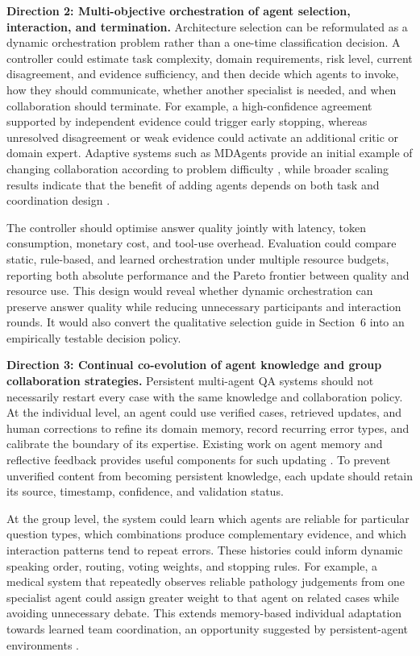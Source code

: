 \textbf{Direction 2: Multi-objective orchestration of agent selection,
interaction, and termination.}
Architecture selection can be reformulated as a dynamic orchestration problem
rather than a one-time classification decision. A controller could estimate
task complexity, domain requirements, risk level, current disagreement, and
evidence sufficiency, and then decide which agents to invoke, how they should
communicate, whether another specialist is needed, and when collaboration
should terminate. For example, a high-confidence agreement supported by
independent evidence could trigger early stopping, whereas unresolved
disagreement or weak evidence could activate an additional critic or domain
expert. Adaptive systems such as MDAgents provide an initial example of
changing collaboration according to problem difficulty
\citep{kim2024mdagents}, while broader scaling results indicate that the
benefit of adding agents depends on both task and coordination design
\citep{qian2024scaling_multiagent}.

The controller should optimise answer quality jointly with latency, token
consumption, monetary cost, and tool-use overhead. Evaluation could compare
static, rule-based, and learned orchestration under multiple resource budgets,
reporting both absolute performance and the Pareto frontier between quality
and resource use. This design would reveal whether dynamic orchestration can
preserve answer quality while reducing unnecessary participants and
interaction rounds. It would also convert the qualitative selection guide in
Section~6 into an empirically testable decision policy.

\textbf{Direction 3: Continual co-evolution of agent knowledge and group
collaboration strategies.}
Persistent multi-agent QA systems should not necessarily restart every case
with the same knowledge and collaboration policy. At the individual level,
an agent could use verified cases, retrieved updates, and human corrections
to refine its domain memory, record recurring error types, and calibrate the
boundary of its expertise. Existing work on agent memory and reflective
feedback provides useful components for such updating
\citep{zhang2024memory_survey,shinn2023reflexion}. To prevent unverified
content from becoming persistent knowledge, each update should retain its
source, timestamp, confidence, and validation status.

At the group level, the system could learn which agents are reliable for
particular question types, which combinations produce complementary evidence,
and which interaction patterns tend to repeat errors. These histories could
inform dynamic speaking order, routing, voting weights, and stopping rules.
For example, a medical system that repeatedly observes reliable pathology
judgements from one specialist agent could assign greater weight to that
agent on related cases while avoiding unnecessary debate. This extends
memory-based individual adaptation towards learned team coordination, an
opportunity suggested by persistent-agent environments
\citep{park2023generative_agents,chen2024agentverse}.

